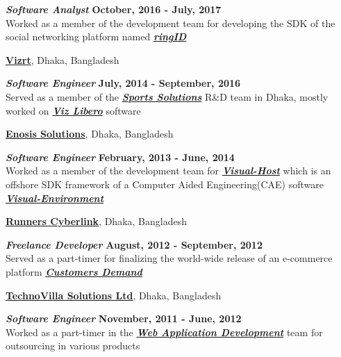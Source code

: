 \documentclass[margin,line]{res}
\begin{document}
\begin{resume}
\vspace{-.4cm}
\textbf{{\em Software Analyst}} \hfill {\bf October, 2016 - July, 2017}\\
Worked as a member of the development team for developing the SDK of the social networking platform named \textbf{\textit{\href{https://www.ringid.com/}{ringID}}}

\vspace{-.2cm}
{\bf \href{http://www.vizrt.com/}{Vizrt}}, Dhaka, Bangladesh

\vspace{-.4cm}
\textbf{{\em Software Engineer}} \hfill {\bf July, 2014 - September, 2016}\\
Served as a member of the \textbf{\textit{\href{http://www.vizrt.com/sports/}{Sports Solutions}}} R\&D team in Dhaka, mostly worked on \textbf{\textit{\href{http://www.vizrt.com/products/viz_libero/}{Viz Libero}}} software

\vspace{-.2cm}
{\bf \href{http://www.enosisbd.com/}{Enosis Solutions}}, Dhaka, Bangladesh

\vspace{-.4cm}
\textbf{{\em Software Engineer}} \hfill {\bf February, 2013 - June, 2014}\\
Worked as a member of the development team for \textbf{\textit{\href{http://www.enosisbd.com/downloads/dev_engineering.pdf}{Visual-Host}}} which is an offshore SDK framework of a Computer Aided Engineering(CAE) software \textbf{\textit{\href{https://www.esi-group.com/software-solutions/virtual-integration-platform/multi-domain-simulation/visual-environment}{Visual-Environment}}}

\vspace{-.2cm}
{\bf \href{http://runnercyberlink.com/site/}{Runners Cyberlink}}, Dhaka, Bangladesh

\vspace{-.4cm}
\textbf{{\em Freelance Developer}} \hfill {\bf August, 2012 - September, 2012}\\
Served as a part-timer for finalizing the world-wide release of an e-commerce platform \textbf{\textit{\href{http://customersdemand.com/}{Customers Demand}}}

\vspace{-.2cm}
{\bf \href{http://www.technovilla.net/}{TechnoVilla Solutions Ltd}}, Dhaka, Bangladesh

\vspace{-.4cm}
\textbf{{\em Software Engineer}} \hfill {\bf November, 2011 - June, 2012}\\
Worked as a part-timer in the \textbf{\textit{\href{http://www.technovilla.net/web-application-development}{Web Application Development}}} team for outsourcing in various products


\end{resume}
\end{document}
